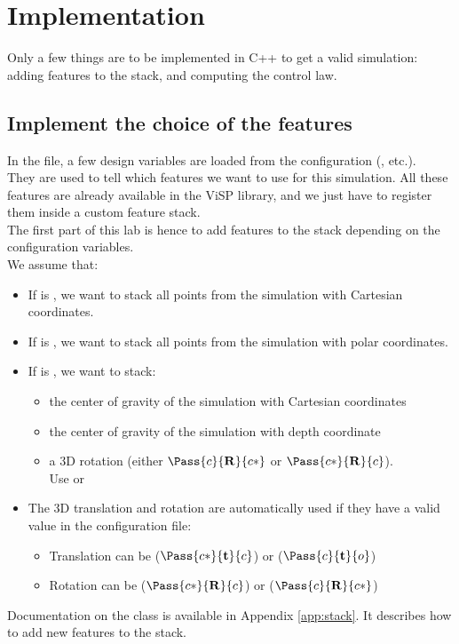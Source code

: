 \documentclass{ecnreport}
\begin{document}
\section{Implementation}

Only a few things are to be implemented in C++ to get a valid simulation: adding features to the stack, and computing the control law.

\subsection{Implement the choice of the features}

In the  file, a few design variables are loaded from the configuration (, etc.).\\

They are used to tell which features we want to use for this simulation. All these features are already available in the ViSP library, and we just have to register them inside a custom feature stack.\\

The first part of this lab is hence to add features to the stack depending on the configuration variables.\\
We assume that:
\begin{itemize}
 \item If  is , we want to stack all points from the simulation with Cartesian coordinates.
 \item If  is , we want to stack all points from the simulation with polar coordinates.
 \item If  is , we want to stack:
 \begin{itemize}
  \item the center of gravity of the simulation with Cartesian coordinates
  \item the center of gravity of the simulation with depth coordinate
  \item a 3D rotation (either $\Pass{c}{\mathbf{R}}{c*}$ or $\Pass{c*}{\mathbf{R}}{c}$).\\Use {} or 
 \end{itemize}
 \item The 3D translation and rotation are automatically used if they have a valid value in the configuration file:
 \begin{itemize}
  \item Translation can be  ($\Pass{c*}{\mathbf{t}}{c}$) or  ($\Pass{c}{\mathbf{t}}{o}$)
  \item Rotation can be   ($\Pass{c*}{\mathbf{R}}{c}$) or  ($\Pass{c}{\mathbf{R}}{c*}$)
 \end{itemize}
\end{itemize}
Documentation on the  class is available in Appendix \ref{app:stack}. It describes how to add new features to the stack.\\
\end{document}
